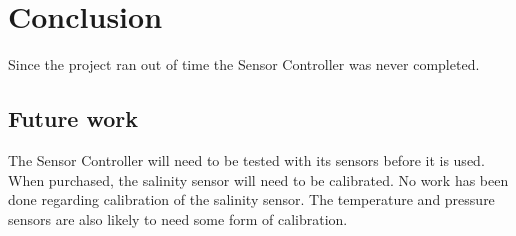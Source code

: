 
\section{Conclusion}\label{sec:conclusion}
Since the project ran out of time the Sensor Controller was never completed.

\subsection{Future work}
The Sensor Controller will need to be tested with its sensors before it is used. \\
When purchased, the salinity sensor will need to be calibrated. No work has been done regarding calibration of the salinity sensor. The temperature and pressure sensors are also likely to need some form of calibration.
\pagebreak
